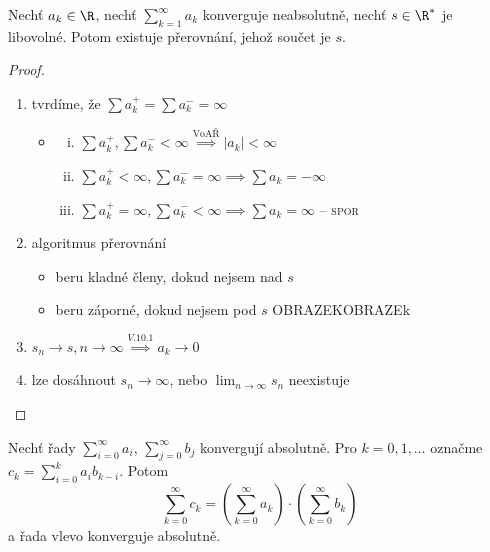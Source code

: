 \begin{veta}
  Nechť $a_k \in \R$, nechť $\sum_{k=1}^{\infty} a_k$ konverguje neabsolutně, nechť $s \in \R^*$ je libovolné. Potom existuje přerovnání, jehož součet je $s$.
\end{veta}

\begin{proof}
  \begin{enumerate}[1.]
    \item tvrdíme, že $\sum a_k^+=\sum a_k^-=\infty$

    \begin{itemize}
      \item[??]\begin{enumerate}[i.]
        \item $\sum a_k^+, \sum a_k^-<\infty \stackrel{\text{VoAŘ}}{\implies} |a_k|<\infty$
        \item $\sum a_k^+ < \infty, \sum a_k^- = \infty\implies\sum a_k = -\infty$
        \item $\sum a_k^+ = \infty, \sum a_k^- < \infty\implies\sum a_k = \infty$ -- \textsc{spor} \Lightning \end{enumerate}
    \end{itemize}
    \item algoritmus přerovnání
    \begin{itemize}
      \item beru kladné členy, dokud nejsem nad $s$
      \item beru záporné, dokud nejsem pod $s$
      OBRAZEKOBRAZEk
    \end{itemize}
    \item $s_n \to s, n \to \infty \stackrel{V. 10. 1}{\implies} a_k \to 0$
    \item lze dosáhnout $s_n \to \infty$, nebo $\lim_{n\to \infty} s_n$ neexistuje
  \end{enumerate}
\end{proof}

\begin{veta}
Nechť řady $\sum_{i=0}^{\infty} a_i$, $\sum_{j=0}^{\infty} b_j$ konvergují absolutně. Pro $k = 0, 1, \ldots$ označme $c_k = \sum_{i=0}^{k} a_i b_{k-i}$. Potom
\[
\sum_{k=0}^{\infty} c_k = \left(\sum_{k=0}^{\infty} a_k\right) \cdot \left(\sum_{k=0}^{\infty} b_k\right)
\]
a řada vlevo konverguje absolutně.
\end{veta}

